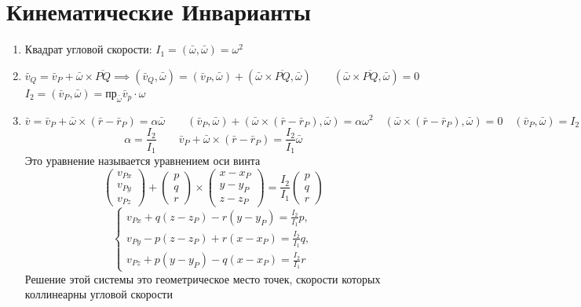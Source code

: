 \documentclass[crop=false]{standalone}
\begin{document}
\section{Кинематические Инварианты}
\begin{enumerate}
    \item Квадрат угловой скорости: $I_1 = (\bar \omega, \bar \omega) = \omega^2$
    \item 
    \[ \bar v_Q = \bar v_P + \bar \omega \times \overline{PQ} \implies (\bar v_Q, \bar \omega) = (\bar v_P , \bar \omega) + (\bar \omega \times \overline{PQ}, \bar \omega) \qquad (\bar \omega \times \overline{PQ}, \bar \omega) = 0\] %
    $I_2 = (\bar v_P, \bar \omega) = \text{пр}_{\bar \omega} \bar v_p \cdot \omega $
    \item 
    \[\bar v = \bar v_P + \bar \omega \times (\bar r - \bar r_P) = \alpha \bar \omega \qquad (\bar v_P, \bar \omega) + (\bar \omega \times (\bar r - \bar r_P), \bar \omega) = \alpha \omega^2 \quad (\bar \omega \times (\bar r - \bar r_P), \bar \omega) = 0 \quad (\bar v_P, \bar \omega) = I_2\]
    \[ \alpha = \frac{I_2}{I_1} \qquad \bar v_P + \bar \omega \times (\bar r - \bar r_P) = \frac{I_2}{I_1} \bar \omega\]
    Это уравнение называется уравнением оси винта
    \[\begin{pmatrix}
        v_{Px} \\ v_{Py} \\ v_{Pz}
    \end{pmatrix} + \begin{pmatrix}
        p \\ q \\ r
    \end{pmatrix} \times \begin{pmatrix}
        x - x_P \\ y - y_P \\ z - z_P
    \end{pmatrix} = \frac{I_2}{I_1} \begin{pmatrix}
        p \\ q \\ r
    \end{pmatrix}
    \]
    \[ 
    \begin{cases}
    v_{Px} + q (z-z_P) - r(y - y_P) = \frac{I_2}{I_1} p, \\
    v_{Py} - p (z - z_P) + r (x - x_P) = \frac{I_2}{I_1}q , \\
    v_{Pz} + p(y - y_P) - q(x - x_P) = \frac{I_2}{I_1} r
    \end{cases}
    \]
    Решение этой системы это геометрическое место точек, скорости которых коллинеарны угловой скорости %
\end{enumerate}
\end{document}

